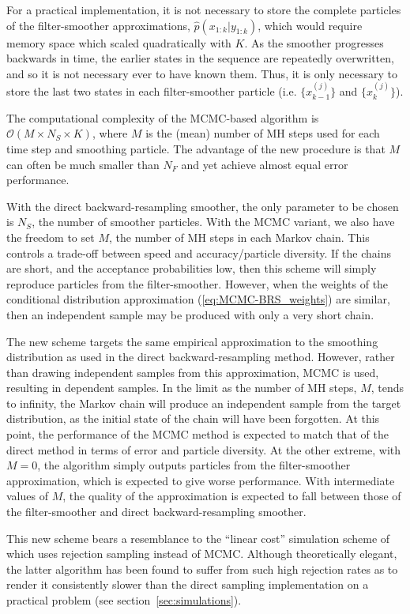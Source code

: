 \documentclass[10pt,twocolumn,twoside]{IEEEtran}
\begin{document}
For a practical implementation, it is not necessary to store the complete particles of the filter-smoother approximations, $\hat{p}(x_{1:k}|y_{1:k})$, which would require memory space which scaled quadratically with $K$. As the smoother progresses backwards in time, the earlier states in the sequence are repeatedly overwritten, and so it is not necessary ever to have known them. Thus, it is only necessary to store the last two states in each filter-smoother particle (i.e. $\{x_{k-1}^{(j)}\}$ and $\{x_{k}^{(j)}\}$).

The computational complexity of the MCMC-based algorithm is $\mathcal{O}(M \times N_S \times K)$, where $M$ is the (mean) number of MH steps used for each time step and smoothing particle. The advantage of the new procedure is that $M$ can often be much smaller than $N_F$ and yet achieve almost equal error performance.

With the direct backward-resampling smoother, the only parameter to be chosen is $N_S$, the number of smoother particles. With the MCMC variant, we also have the freedom to set $M$, the number of MH steps in each Markov chain. This controls a trade-off between speed and accuracy/particle diversity. If the chains are short, and the acceptance probabilities low, then this scheme will simply reproduce particles from the filter-smoother. However, when the weights of the conditional distribution approximation (\ref{eq:MCMC-BRS_weights}) are similar, then an independent sample may be produced with only a very short chain.

The new scheme targets the same empirical approximation to the smoothing distribution as used in the direct backward-resampling method. However, rather than drawing independent samples from this approximation, MCMC is used, resulting in dependent samples.  In the limit as the number of MH steps, $M$, tends to infinity, the Markov chain will produce an independent sample from the target distribution, as the initial state of the chain will have been forgotten. At this point, the performance of the MCMC method is expected to match that of the direct method in terms of error and particle diversity. At the other extreme, with $M=0$, the algorithm simply outputs particles from the filter-smoother approximation, which is expected to give worse performance. With intermediate values of $M$, the quality of the approximation is expected to fall between those of the filter-smoother and direct backward-resampling smoother.

This new scheme bears a resemblance to the ``linear cost'' simulation scheme of \cite{Douc2009} which uses rejection sampling instead of MCMC. Although theoretically elegant, the latter algorithm has been found to suffer from such high rejection rates as to render it consistently slower than the direct sampling implementation on a practical problem (see section~\ref{sec:simulations}).
\end{document}
